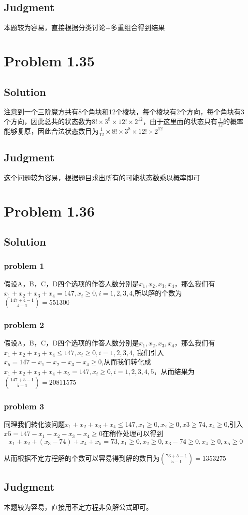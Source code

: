 \documentclass[a4paper]{ctexart}
\begin{document}
\subsection{Judgment}
本题较为容易，直接根据分类讨论+多重组合得到结果
\section{Problem 1.35}
\subsection{Solution}
注意到一个三阶魔方共有8个角块和12个棱块，每个棱块有2个方向，每个角块有3个方向，因此总共的状态数为$8!\times 3^8\times 12!\times 2^{12}$，由于这里面的状态只有$\frac{1}{12}$的概率能够复原，因此合法状态数目为$\frac{1}{12}\times 8!\times 3^8\times 12!\times 2^{12}$
\subsection{Judgment}
这个问题较为容易，根据题目求出所有的可能状态数乘以概率即可
\section{Problem 1.36}
\subsection{Solution}
\subsubsection{problem 1}
假设A，B，C，D四个选项的作答人数分别是$x_1,x_2,x_3,x_4$，那么我们有$x_1+x_2+x_3+x_4=147,x_i\geq 0,i=1,2,3,4$,所以解的个数为$\binom{147+4-1}{4-1}=551300$
\subsubsection{problem 2}
假设A，B，C，D四个选项的作答人数分别是$x_1,x_2,x_3,x_4$，那么我们有$x_1+x_2+x_3+x_4\leq 147,x_i\geq 0,i=1,2,3,4$, 我们引入$x_5=147-x_1-x_2-x_3-x_4\geq 0$,从而我们转化成$x_1+x_2+x_3+x_4+x_5=147,x_i\geq 0,i=1,2,3,4,5$，从而结果为$\binom{147+5-1}{5-1}=20811575$
\subsubsection{problem 3}
同理我们转化该问题$x_1+x_2+x_3+x_4\leq 147, x_1\geq 0, x_2\geq 0, x3\geq 74, x_4\geq 0$,引入$x5 = 147-x_1-x_2-x_3-x_4\geq 0$在稍作处理可以得到
\begin{equation}
    x_1+x_2+(x_3-74)+x_4+x_5=73,x_1\geq 0, x_2\geq 0,x_3-74\geq 0, x_4\geq 0,x_5\geq 0
\end{equation}
\par
从而根据不定方程解的个数可以容易得到解的数目为$\binom{73+5-1}{5-1}=1353275$
\subsection{Judgment}
本题较为容易，直接用不定方程非负解公式即可。
\end{document}
